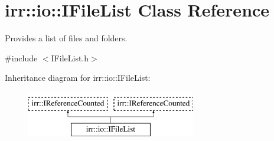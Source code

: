 \hypertarget{classirr_1_1io_1_1IFileList}{}\section{irr\+:\+:io\+:\+:I\+File\+List Class Reference}
\label{classirr_1_1io_1_1IFileList}


Provides a list of files and folders.  




{\ttfamily \#include $<$I\+File\+List.\+h$>$}

Inheritance diagram for irr\+:\+:io\+:\+:I\+File\+List\+:\begin{figure}[H]
\begin{center}
\leavevmode
\includegraphics[height=2.000000cm]{classirr_1_1io_1_1IFileList}
\end{center}
\end{figure}
